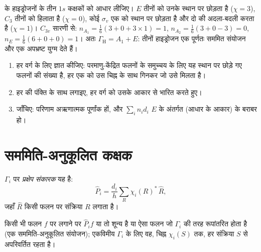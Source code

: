\begin{example}[अमोनिया के हाइड्रोजन कक्षक]\label{ex:b3:group-theory-applied:nh3}
 के हाइड्रोजनों के तीन $1s$ कक्षकों को आधार लीजिए। $E$
तीनों को उनके स्थान पर छोड़ता है ($\chi = 3$), $C_3$ तीनों को हिलाता है ($\chi = 0$), कोई
$\sigma_v$ एक को स्थान पर छोड़ता है और दो की अदला-बदली करता है ($\chi = 1$)। $C_{3v}$ सारणी से:
$n_{A_1} = \frac16(3 + 0 + 3\times1) = 1$, $n_{A_2} = \frac16(3 + 0 - 3) = 0$,
$n_E = \frac16(6 + 0 + 0) = 1$। अतः $\Gamma_{\mathrm H} = A_1 + E$: तीनों
हाइड्रोजन एक पूर्णतः सममित संयोजन और एक अपभ्रष्ट युग्म देते हैं।
\end{example}

\begin{method}[निरूपण का लघुकरण]\label{met:b3:group-theory-applied:reduce}
\begin{enumerate}
  \item हर वर्ग के लिए  ज्ञात कीजिए: परमाणु-केंद्रित फलनों के समुच्चय के लिए
        यह स्थान पर छोड़े गए फलनों की संख्या है, हर एक को उस चिह्न के साथ गिनकर
        जो उसे मिलता है।
  \item हर  की पंक्ति के साथ  लगाइए,
        हर वर्ग को उसके आकार से भारित करते हुए।
  \item जाँचिए: परिणाम अऋणात्मक पूर्णांक हों, और $\sum_in_id_i$
        $E$ के अंतर्गत  (आधार के आकार) के बराबर हो।
\end{enumerate}
\end{method}

\section{सममिति-अनुकूलित कक्षक}

\begin{definition}[प्रक्षेप संकारक]\label{def:b3:group-theory-applied:projection}
 $\Gamma_i$ पर \emph{प्रक्षेप संकारक}
यह है:
\[
\hat P_i = \frac{d_i}{h}\sum_R\chi_i(R)^*\,\hat R,
\]
जहाँ $\hat R$ किसी फलन पर संक्रिया $R$ लगाता है।
\end{definition}

\begin{proposition}[प्रक्षेप संकारक क्या करता है]\label{prop:b3:group-theory-applied:projection}
किसी भी फलन $f$ पर लगाने पर $\hat P_if$ या तो शून्य है या ऐसा फलन जो
$\Gamma_i$ की तरह रूपांतरित होता है (एक सममिति-अनुकूलित संयोजन); एकविमीय
$\Gamma_i$ के लिए वह, चिह्न $\chi_i(S)$ तक, हर
संक्रिया $S$ से अपरिवर्तित रहता है।
\end{proposition}

